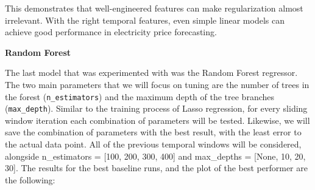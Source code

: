 \documentclass[12pt]{report} %
\begin{document}
This demonstrates that well-engineered features can make regularization almost irrelevant. With the right temporal features, even simple linear models can achieve good performance in electricity price forecasting.







\noindent \textbf{Random Forest}

The last model that was experimented with was the Random Forest regressor. The two main parameters that we will focus on tuning are the number of trees in the forest (\verb|n_estimators|) and the maximum depth of the tree branches (\verb|max_depth|). Similar to the training process of Lasso regression, for every sliding window iteration each combination of parameters will be tested. Likewise, we will save the combination of parameters with the best result, with the least error to the actual data point. All of the previous temporal windows will be considered, alongside n\_estimators = [100, 200, 300, 400] and max\_depths = [None, 10, 20, 30]. The results for the best baseline runs, and the plot of the best performer are the following:
\end{document}
